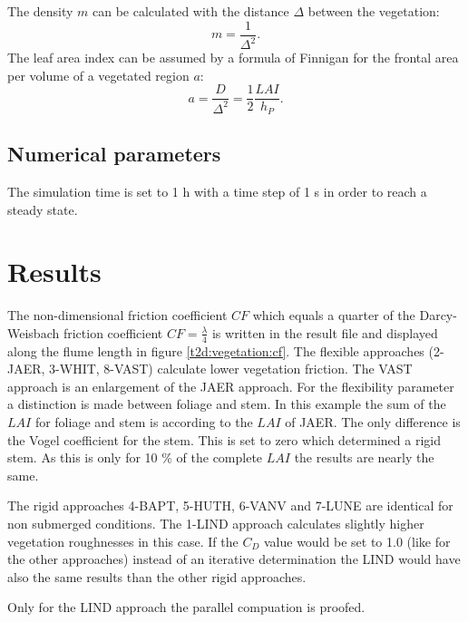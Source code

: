 The density $m$ can be calculated with the distance $\Delta$ between the vegetation: 
\begin{equation}
m = \frac{1}{\Delta^2} .
\end{equation}
The leaf area index can be assumed by a formula of Finnigan \cite{finnigan2000}
for the frontal area per volume of a vegetated region $a$:
\begin{equation}
a = \frac{D}{\Delta^2} = \frac{1}{2} \frac{LAI}{h_P}.
\end{equation}

\subsection{Numerical parameters}

The simulation time is set to 1 h with a time step of 1 s in order to reach a steady state. 


\section{Results}

The non-dimensional friction coefficient $CF$ which equals a quarter of the
Darcy-Weisbach friction coefficient $CF = \frac{\lambda}{4}$ is written in the
result file and displayed along the flume length in figure \ref{t2d:vegetation:cf}. 
The flexible approaches (2-JAER, 3-WHIT, 8-VAST) calculate lower vegetation friction. 
The VAST approach is an enlargement of the JAER approach.
For the flexibility parameter a distinction is made between foliage and stem.
In this example the sum of the $LAI$ for foliage and stem is according to the
$LAI$ of JAER.
The only difference is the Vogel coefficient for the stem.
This is set to zero which determined a rigid stem.
As this is only for 10 \% of the complete $LAI$ the results are nearly the same.
\newline

The rigid approaches 4-BAPT, 5-HUTH, 6-VANV and 7-LUNE are identical for non
submerged conditions.
The 1-LIND approach calculates slightly higher vegetation roughnesses in this case.
If the $C_D$ value would be set to 1.0 (like for the other approaches) instead
of an iterative determination the LIND would have also the same results than
the other rigid approaches.

Only for the LIND approach the parallel compuation is proofed.



